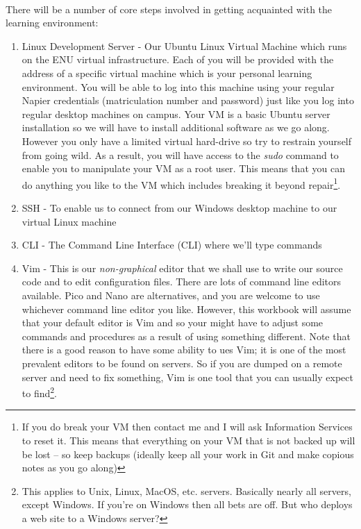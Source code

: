 \documentclass[12pt, a4paper, oneside]{book}
\begin{document}
\paragraph{} There will be a number of core steps involved in getting acquainted with the learning environment:

\begin{enumerate}
\item Linux Development Server - Our Ubuntu Linux Virtual Machine which runs on the ENU virtual infrastructure. Each of you will be provided with the address of a specific virtual machine which is your personal learning environment. You will be able to log into this machine using your regular Napier credentials (matriculation number and password) just like you log into regular desktop machines on campus. Your VM is a basic Ubuntu server installation so we will have to install additional software as we go along. However you only have a limited virtual hard-drive so try to restrain yourself from going wild. As a result, you will have access to the \emph{sudo} command to enable you to manipulate your VM as a root user. This means that you can do anything you like to the VM which includes breaking it beyond repair\footnote{If you do break your VM then contact me and I will ask Information Services to reset it. This means that everything on your VM that is not backed up will be lost -- so keep backups (ideally keep all your work in Git and make copious notes as you go along)}.
\item SSH - To enable us to connect from our Windows desktop machine to our virtual Linux machine
\item CLI - The Command Line Interface (CLI) where we'll type commands
\item Vim - This is our \emph{non-graphical} editor that we shall use to write our source code and to edit configuration files. There are lots of command line editors available. Pico and Nano are alternatives, and you are welcome to use whichever command line editor you like. However, this workbook will assume that your default editor is Vim and so your might have to adjust some commands and procedures as a result of using something different. Note that there is a good reason to have some ability to ues Vim; it is one of the most prevalent editors to be found on servers. So if you are dumped on a remote server and need to fix something, Vim is one tool that you can usually expect to find\footnote{This applies to Unix, Linux, MacOS, etc. servers. Basically nearly all servers, except Windows. If you're on Windows then all bets are off. But who deploys a web site to a Windows server?}.

\end{enumerate}
\end{document}
